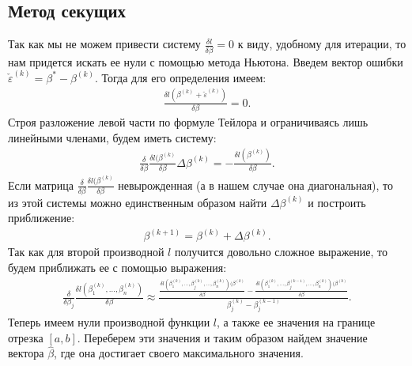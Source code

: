 \documentclass[a4paper,14pt]{extarticle}
\begin{document}
\subsection{Метод секущих}\label{sec4_2}
Так как мы не можем привести систему $ \frac{\delta l}{\delta \beta}=0$ к виду, удобному для итерации, то нам придется искать ее нули с помощью метода Ньютона.
Введем вектор ошибки $\check{\varepsilon}^{(k)}=\beta^{*}-\beta^{(k)}$. Тогда для его определения имеем:
\begin{eqnarray}
    \frac{\delta l (\beta^{(k)}+\check{\varepsilon}^{(k)})}{\delta \beta}=0.
\end{eqnarray}
Строя разложение левой части по формуле Тейлора и ограничиваясь лишь линейными членами\cite{NumericalMethods}, будем иметь систему:
\begin{eqnarray}
    \frac{\delta }{\delta \beta}\frac{\delta l (\beta^{(k)}}{\delta \beta}\Delta \beta^{(k)}=-\frac{\delta l (\beta^{(k)})}{\delta \beta}.
\end{eqnarray}
Если матрица $\frac{\delta }{\delta \beta}\frac{\delta l (\beta^{(k)}}{\delta \beta}$ невырожденная (а в нашем случае она диагональная), то из этой системы можно единственным образом найти $\Delta \beta^{(k)}$ и построить приближение:
\begin{eqnarray}
    \beta^{(k+1)}=\beta^{(k)}+\Delta \beta^{(k)}.
\end{eqnarray}
Так как для второй производной $l$ получится довольно сложное выражение, то будем приближать ее с помощью выражения:
\begin{eqnarray}
    \frac{\delta }{\delta \beta_j}\frac{\delta l(\beta_1^{(k)},\dots, \beta_n^{(k)}) }{\delta \beta}\approx \frac{\frac{\delta l(\beta_1^{(k)},\dots,\beta_j^{(k)},\dots, \beta_n^{(k)}) (\beta^{(k)}}{\delta \beta}-\frac{\delta l(\beta_1^{(k)},\dots,\beta_j^{(k-1)},\dots, \beta_n^{(k)}) (\beta^{(k)}}{\delta \beta}}{\beta_j^{(k)}-\beta_j^{(k-1)}}.
\end{eqnarray}
Теперь имеем нули производной функции $l$, а также ее значения на границе отрезка $[a,b]$.
Переберем эти значения и таким образом найдем значение вектора $\hat{\beta}$, где она достигает своего максимального значения.
\end{document}
